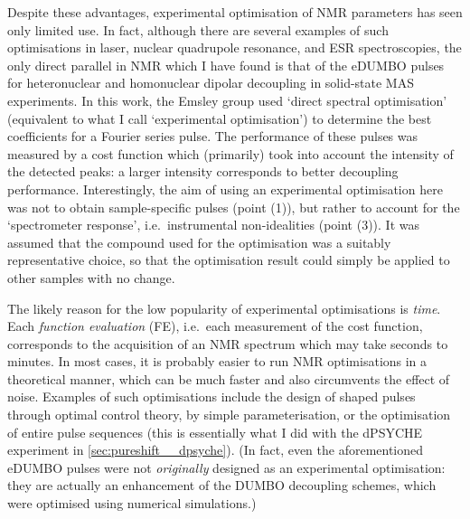 Despite these advantages, experimental optimisation of NMR parameters has seen only limited use.
In fact, although there are several examples of such optimisations in laser\autocite{Bardeen1997CPL}, nuclear quadrupole resonance\autocite{Schiano1999JMR,Schiano2000ZNA,Monea2020JMR}, and ESR\autocite{Goodwin2018JMR} spectroscopies, 
the only direct parallel in NMR which I have found is that of the eDUMBO pulses for heteronuclear\autocite{DePaepe2003CPL,Elena2004CPL} and homonuclear dipolar\autocite{Salager2010CPL} decoupling in solid-state MAS experiments.
In this work, the Emsley group used `direct spectral optimisation' (equivalent to what I call `experimental optimisation') to determine the best coefficients for a Fourier series pulse.
The performance of these pulses was measured by a cost function which (primarily) took into account the intensity of the detected peaks: a larger intensity corresponds to better decoupling performance.
Interestingly, the aim of using an experimental optimisation here was not to obtain sample-specific pulses (point (1)), but rather to account for the `spectrometer response', i.e.\ instrumental non-idealities (point (3)).
It was assumed that the compound used for the optimisation was a suitably representative choice, so that the optimisation result could simply be applied to other samples with no change.

The likely reason for the low popularity of experimental optimisations is \textit{time}.
Each \textit{function evaluation} (FE), i.e.\ each measurement of the cost function, corresponds to the acquisition of an NMR spectrum which may take seconds to minutes.
In most cases, it is probably easier to run NMR optimisations in a theoretical manner, which can be much faster and also circumvents the effect of noise.
Examples of such optimisations include the design of shaped pulses through optimal control theory\autocite{Skinner2003JMR,Khaneja2005JMR,Kobzar2008JMR,Kobzar2012JMR,Schilling2014ACIE,Glaser2015EPJD}, by simple parameterisation\autocite{Geen1989JMR,Emsley1990CPL,Geen1991JMR,Nuzillard1994JMRSA,Kupce1995JMRSA,Kupce1995JMRSB}, or the optimisation of entire pulse sequences\autocite{Shaka1985JMR,Freeman1987JMR,Bechmann2013JMR,Ehni2014JMR,Lapin2020JMR} (this is essentially what I did with the dPSYCHE experiment in \cref{sec:pureshift__dpsyche}).
(In fact, even the aforementioned eDUMBO pulses were not \textit{originally} designed as an experimental optimisation: they are actually an enhancement of the DUMBO decoupling schemes, which were optimised using numerical simulations\autocite{Sakellariou2000CPL}.)


